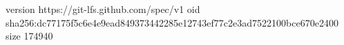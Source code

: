 version https://git-lfs.github.com/spec/v1
oid sha256:dc77175f5c6e4e9ead849373442285e12743ef77c2e3ad7522100bce670e2400
size 174940
